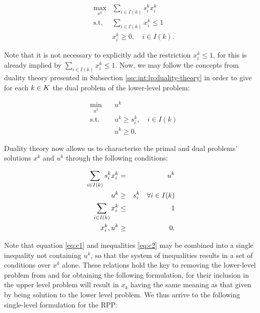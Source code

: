 \begin{eqnarray*}
    &\max_{x^k} & \sum_{i \in I(k)} s_i^k x_i^k\\
    &\text{s.t.}& \sum_{i \in I(k)}       x_i^k \leq 1\\
    &           &                         x_i^k \geq 0, \quad i \in I(k).
\end{eqnarray*}

Note that it is not necessary to explicitly add the restriction $x_i^k \leq 1$,
for this is already implied by
$
    \sum_{i \in I(k)} x_i^k \leq 1
$.
Now, we may follow the concepts from duality theory presented in Subsection
\ref{ssc:int:lp:duality-theory} in order to give for each ${k \in K}$ the dual problem
of the lower-level problem:

\begin{eqnarray*}
    &\min_{u^k}  & \quad u^k\\
    &\text{s.t.} & \quad u^k \geq s_i^k, \quad i \in I(k)\\
    &            & \quad u^k \geq 0.
\end{eqnarray*}

\noindent
Duality theory now allows us to characterise the primal and dual problems'
solutions $x^k$ and $u^k$ through the following conditions:

\begin{eqnarray}
    \sum_{i\in I(k)} s_i^kx_i^k &=   & u^k                            \label{eq:c1}\\
                          u  ^k &\geq& s_i^k \quad \forall i \in I(k) \label{eq:c2}\\
    \sum_{i\in I(k)}      x_i^k &\leq& 1\notag\\
                   x_i^k, u  ^k &\geq& 0\notag.
\end{eqnarray}

Note that equation \eqref{eq:c1} and inequalities \eqref{eq:c2} may be combined
into a single inequality not containing $u^k$, so that the system of
inequalities results in a set of conditions over $x^k$ alone. These relations
hold the key to removing the lower-level problem from \bnlv and for obtaining the
following formulation, for their inclusion in the upper level problem will
result in $x_k$ having the same meaning as that given by being solution to the
lower level problem. We thus arrive to the following single-level formulation
for the RPP:

